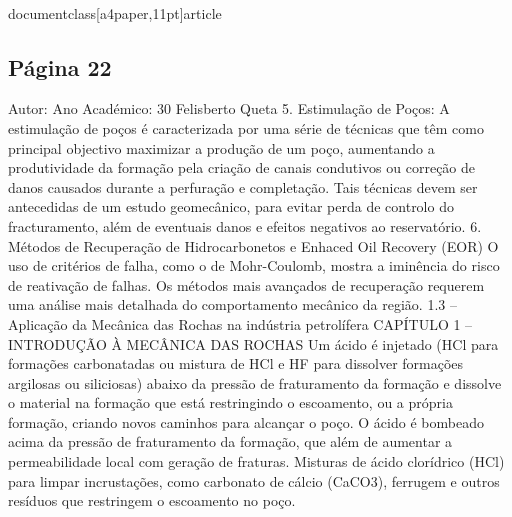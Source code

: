 \\documentclass[a4paper,11pt]{article}
\begin{document}
\subsection*{Página 22}
Autor:
Ano Académico:
30
Felisberto Queta
5. Estimulação de Poços:
A estimulação de poços é caracterizada por uma série de técnicas que têm como principal objectivo maximizar a
produção de um poço, aumentando a produtividade da formação pela criação de canais condutivos ou correção
de danos causados durante a perfuração e completação.
Tais técnicas devem ser antecedidas de um estudo geomecânico, para evitar perda de controlo do fracturamento,
além de eventuais danos e efeitos negativos ao reservatório.
6. Métodos de Recuperação de Hidrocarbonetos e Enhaced Oil Recovery (EOR)
O uso de critérios de falha, como o de Mohr-Coulomb, mostra a iminência do risco de reativação de
falhas. Os métodos mais avançados de recuperação requerem uma análise mais detalhada do
comportamento mecânico da região.
1.3 – Aplicação da Mecânica das Rochas na indústria petrolífera
CAPÍTULO 1 – INTRODUÇÃO À MECÂNICA DAS ROCHAS
Um ácido é injetado (HCl
para formações 
carbonatadas ou mistura de 
HCl e HF para dissolver 
formações argilosas ou 
siliciosas) abaixo da 
pressão de fraturamento
da formação e dissolve o 
material na formação que 
está restringindo o 
escoamento, ou a própria 
formação, criando novos 
caminhos para alcançar o 
poço.
O ácido é 
bombeado acima 
da pressão de 
fraturamento da 
formação, que 
além de aumentar 
a permeabilidade 
local com geração 
de fraturas.
Misturas de ácido 
clorídrico (HCl) para 
limpar incrustações, 
como carbonato de 
cálcio (CaCO3), 
ferrugem e outros 
resíduos que 
restringem o 
escoamento no 
poço.
\end{document}

